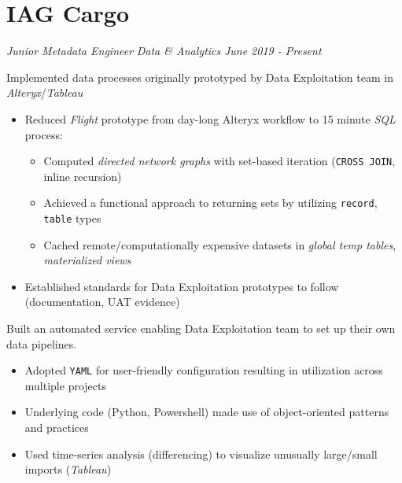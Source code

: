 \documentclass[../cv.tex]{subfiles}
\begin{document}
\section{IAG Cargo}
\textit{Junior Metadata Engineer}
\hfill
\textit{Data \& Analytics}
\hfill
\textit{June 2019 - Present}
\begin{description}[style=multiline, leftmargin=3.5cm]
	\item[Prototype Implementation\\\textnormal{PL/SQL}] Implemented data processes originally prototyped by Data Exploitation team in \textit{Alteryx}/\textit{Tableau}
	      \begin{itemize}
		      \item Reduced \textit{Flight} prototype from day-long Alteryx workflow to 15 minute \textit{SQL} process:
		            \begin{itemize}
			            \item Computed \textit{directed network graphs} with set-based iteration (\texttt{CROSS JOIN}, inline recursion)
			            \item Achieved a functional approach to returning sets by utilizing \texttt{record}, \texttt{table} types
			            \item Cached remote/computationally expensive datasets in \textit{global temp tables}, \textit{materialized views}
					\end{itemize}
		      \item Established standards for Data Exploitation prototypes to follow (documentation, UAT evidence)
	      \end{itemize}
	\item[Self-Service Pipeline Creation\\\textnormal{\texttt{Python\\Powershell\\YAML}}]
	      Built an automated service enabling Data Exploitation team to set up their own data pipelines.
	      \begin{itemize}
			  \item Adopted \texttt{YAML} for user-friendly configuration resulting in utilization across multiple projects
			  \item Underlying code (Python, Powershell) made use of object-oriented patterns and practices
			  \item Used time-series analysis (differencing) to visualize unusually large/small imports (\textit{Tableau})

\end{itemize}
\end{description}
\end{document}
